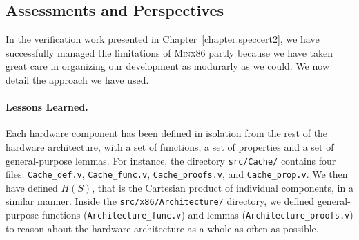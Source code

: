 \subsection{Assessments and Perspectives}
\label{subsec:freespec:approachoverview}

In the verification work presented in Chapter~\ref{chapter:speccert2}, we have
successfully managed the limitations of {\scshape Minx86} partly because we have
taken great care in organizing our development as modurarly as we could.
%
We now detail the approach we have used. 

\paragraph{Lessons Learned.}
%
%
Each hardware component has been defined in isolation from the rest of the
hardware architecture, with a set of functions, a set of properties and a set of
general-purpose lemmas.
%
For instance, the directory \texttt{src/Cache/} contains four files:
\texttt{Cache\_def.v}, \texttt{Cache\_func.v}, \texttt{Cache\_proofs.v}, and
\texttt{Cache\_prop.v}.
%
We then have defined \( H(S) \), that is the Cartesian product of
individual components, in a similar manner.
%
Inside the \texttt{src/x86/Architecture/} directory, we defined general-purpose
functions (\texttt{Architecture\_func.v}) and lemmas
(\texttt{Architecture\_proofs.v}) to reason about the hardware architecture as a
whole as often as possible.

